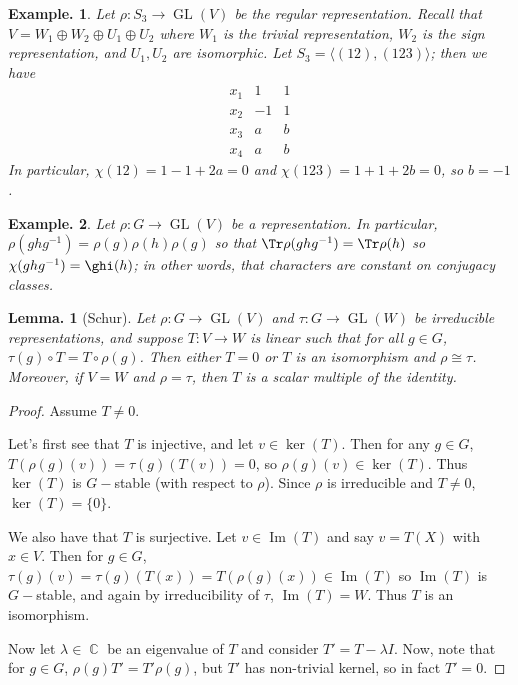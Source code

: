 \documentclass[11pt, a4paper]{memoir}
\DeclareMathOperator{\C}{{\mathbb{C}}}
\theoremstyle{change}
\newtheorem{lemma}[theorem]{Lemma.}
\theoremstyle{plain}
\theoremstyle{nonumberplain}
\newtheorem{example}{Example.}
\newtheorem{proof}{Proof}
\DeclareMathOperator{\GL}{GL}
\renewcommand{\Im}{\ensuremath{\operatorname{Im}}}
\numberwithin{equation}{section}
\begin{document}
\begin{example}
    Let $\rho:S_3\to\GL(V)$ be the regular representation.
    Recall that $V=W_1\oplus W_2\oplus U_1\oplus U_2$ where $W_1$ is the trivial representation, $W_2$ is the sign representation, and $U_1,U_2$ are isomorphic.
    Let $S_3=\langle (12),(123)\rangle$; then we have
    \begin{equation*}
        \begin{array}{c|cc}
            x_1 & 1 & 1\\
            \hline
            x_2 & -1 & 1\\
            x_3 & a & b\\
            x_4 & a & b
        \end{array}
    \end{equation*}
    In particular, $\chi(12)=1-1+2a=0$ and $\chi(123)=1+1+2b=0$, so $b=-1$.
\end{example}
\begin{example}
    Let $\rho:G\to\GL(V)$ be a representation.
    In particular, $\rho(ghg^{-1})=\rho(g)\rho(h)\rho(g)$ so that $\Tr\rho(ghg^{-1})=\Tr\rho(h)$ so $\chi(ghg^{-1})=\ghi(h)$; in other words, that characters are constant on conjugacy classes.
\end{example}
\begin{lemma}[Schur]
    Let $\rho:G\to\GL(V)$ and $\tau:G\to\GL(W)$ be irreducible representations, and suppose $T:V\to W$ is linear such that for all $g\in G$, $\tau(g)\circ T=T\circ\rho(g)$.
    Then either $T=0$ or $T$ is an isomorphism and $\rho\cong\tau$.
    Moreover, if $V=W$ and $\rho=\tau$, then $T$ is a scalar multiple of the identity.
\end{lemma}
\begin{proof}
    Assume $T\neq 0$.

    Let's first see that $T$ is injective, and let $v\in\ker(T)$.
    Then for any $g\in G$, $T(\rho(g)(v))=\tau(g)(T(v))=0$, so $\rho(g)(v)\in\ker(T)$.
    Thus $\ker(T)$ is $G-$stable (with respect to $\rho$).
    Since $\rho$ is irreducible and $T\neq 0$, $\ker(T)=\{0\}$.

    We also have that $T$ is surjective.
    Let $v\in\Im(T)$ and say $v=T(X)$ with $x\in V$.
    Then for $g\in G$, $\tau(g)(v)=\tau(g)(T(x))=T(\rho(g)(x))\in\Im(T)$ so $\Im(T)$ is $G-$stable, and again by irreducibility of $\tau$, $\Im(T)=W$.
    Thus $T$ is an isomorphism.

    Now let $\lambda\in\C$ be an eigenvalue of $T$ and consider $T'=T-\lambda I$.
    Now, note that for $g\in G$, $\rho(g)T'=T'\rho(g)$, but $T'$ has non-trivial kernel, so in fact $T'=0$.
\end{proof}
\end{document}
